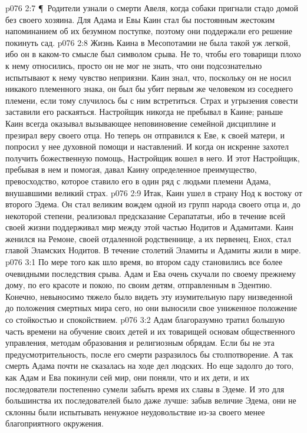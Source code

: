 \vs p076 2:7 \P\ Родители узнали о смерти Авеля, когда собаки пригнали стадо домой без своего хозяина. Для Адама и Евы Каин стал бы постоянным жестоким напоминанием об их безумном поступке, поэтому они поддержали его решение покинуть сад.
\vs p076 2:8 Жизнь Каина в Месопотамии не была такой уж легкой, ибо он в каком\hyp{}то смысле был символом срыва. Не то, чтобы его товарищи плохо к нему относились, просто он не мог не знать, что они подсознательно испытывают к нему чувство неприязни. Каин знал, что, поскольку он не носил никакого племенного знака, он был бы убит первым же человеком из соседнего племени, если тому случилось бы с ним встретиться. Страх и угрызения совести заставили его раскаяться. Настройщик никогда не пребывал в Каине; раньше Каин всегда оказывал вызывающее неповиновение семейной дисциплине и презирал веру своего отца. Но теперь он отправился к Еве, к своей матери, и попросил у нее духовной помощи и наставлений. И когда он искренне захотел получить божественную помощь, Настройщик вошел в него. И этот Настройщик, пребывая в нем и помогая, давал Каину определенное преимущество, превосходство, которое ставило его в один ряд с людьми племени Адама, внушавшими великий страх.
\vs p076 2:9 Итак, Каин ушел в страну Нод к востоку от второго Эдема. Он стал великим вождем одной из групп народа своего отца и, до некоторой степени, реализовал предсказание Серапататьи, ибо в течение всей своей жизни поддерживал мир между этой частью Нодитов и Адамитами. Каин женился на Ремоне, своей отдаленной родственнице, а их первенец, Енох, стал главой Эламских Нодитов. В течение столетий Эламиты и Адамиты жили в мире.
\vs p076 3:1 По мере того как шло время, во втором саду становились все более очевидными последствия срыва. Адам и Ева очень скучали по своему прежнему дому, по его красоте и покою, по своим детям, отправленным в Эдентию. Конечно, невыносимо тяжело было видеть эту изумительную пару низведенной до положения смертных мира сего, но они выносили свое униженное положение со стойкостью и спокойствием.
\vs p076 3:2 Адам благоразумно тратил большую часть времени на обучение своих детей и их товарищей основам общественного управления, методам образования и религиозным обрядам. Если бы не эта предусмотрительность, после его смерти разразилось бы столпотворение. А так смерть Адама почти не сказалась на ходе дел людских. Но еще задолго до того, как Адам и Ева покинули сей мир, они поняли, что и их дети, и их последователи постепенно сумели забыть время их славы в Эдеме. И это для большинства их последователей было даже лучше: забыв величие Эдема, они не склонны были испытывать ненужное неудовольствие из\hyp{}за своего менее благоприятного окружения.
